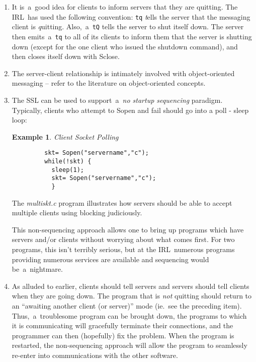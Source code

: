\documentclass[12pt]{article}
\def\SSL{{\small SSL}}
\def\IRL{{\small IRL}}
\newtheorem{example}{Example}[section]
\begin{document}
\begin{enumerate}
  \item It is~a~good idea for clients to inform servers that they are
    quitting.  The \IRL\ has used the following convention:  \verb`tq`
    {\em t\/}ells the server that the messaging client is {\em q\/}uitting.
    Also,~a~\verb`tQ` tells the server to shut itself down.  The server then
    emits~a~\verb`tq` to all of its clients to inform them that the server is
    shutting down (except for the one client who issued the shutdown command),
    and then closes itself down with Sclose.

  \item The server-client relationship is intimately involved with
    object-oriented messaging -- refer to the literature on object-oriented
    concepts.

  \item The {\SSL} can be used to support~a~{\em no startup sequencing} paradigm.
    Typically, clients who attempt to Sopen and fail should go into a
    poll - sleep loop:

     \begin{example} Client Socket Polling      \\ \label{client-polling}
      \begin{verbatim}
         skt= Sopen("servername","c");
         while(!skt) {
           sleep(1);
           skt= Sopen("servername","c");
           }
      \end{verbatim}
     \end{example}

    The {\em multiskt.c} program illustrates how servers should be able
    to accept multiple clients using blocking judiciously.

    This non-sequencing approach allows one to bring up programs which have
    servers and/or clients without worrying about what comes first.  For two
    programs, this isn't terribly serious, but at the \IRL\ numerous
    programs providing numerous services are available and sequencing would
    be~a~nightmare.

  \item As alluded to earlier, clients should tell servers and servers should
    tell clients when they are going down.  The program that is {\em not}
    quitting should return to an ``awaiting another client (or server)'' mode
    (ie.~see the preceding item).  Thus,~a~troublesome program can be brought
    down, the programs to which it is communicating will gracefully terminate
    their connections, and the programmer can then (hopefully) fix the problem.
    When the program is restarted, the non-sequencing approach will allow the
    program to seamlessly re-enter into communications with the other software.


\end{enumerate}
\end{document}
